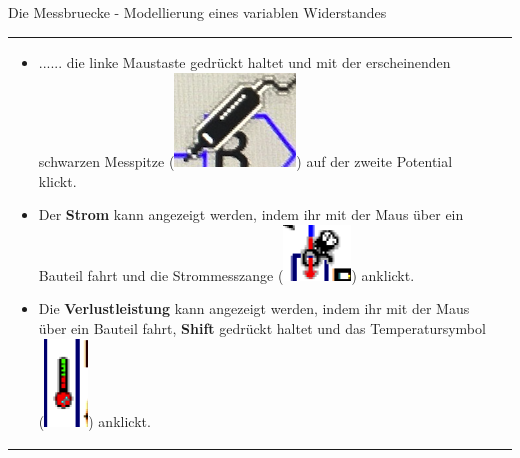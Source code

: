 \begin{frame}[t]{Die Messbruecke - Modellierung eines variablen Widerstandes}
\begin{spacing}{0.9}
\begin{tiny}
\begin{table}[h!]
\begin{tabular}{p{5cm} p{5cm}}
\begin{minipage}{0.5\textwidth}
\begin{itemize}
              \item ...... die linke Maustaste gedrückt haltet und mit der erscheinenden schwarzen Messpitze (\includegraphics[scale=0.1]{pictures/black.png}) auf der zweite Potential klickt.
              \item Der \textbf{Strom} kann angezeigt werden, indem ihr mit der Maus über ein Bauteil fahrt und die Strommesszange (\includegraphics[scale=0.1]{pictures/current.png}) anklickt.
              \item Die \textbf{Verlustleistung} kann angezeigt werden, indem ihr mit der Maus über ein Bauteil fahrt, \textbf{Shift} gedrückt haltet und das Temperatursymbol (\includegraphics[scale=0.1]{pictures/power.png}) anklickt.
            \end{itemize}
          \end{minipage}
          \\
        \end{tabular}

      \end{table}
    \end{tiny} \end{spacing}
\end{frame}

